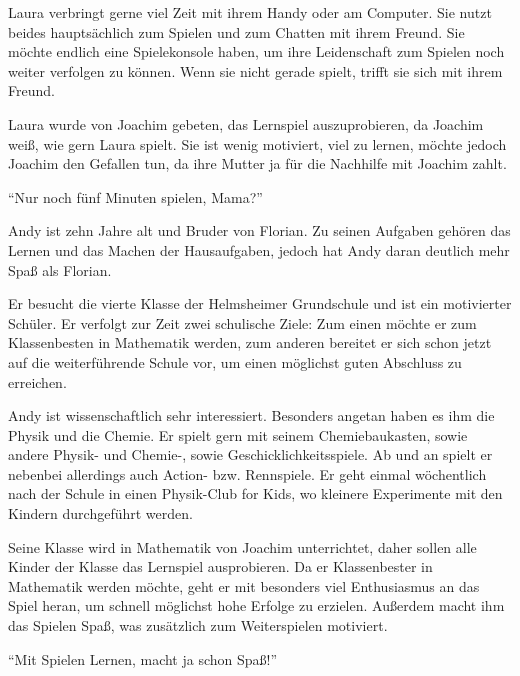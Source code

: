 \begin{description}
\begin{description}
			\item[Interessen und Hobbys]{Laura verbringt gerne viel Zeit mit ihrem Handy oder am Computer. Sie nutzt beides hauptsächlich zum Spielen und zum Chatten mit ihrem Freund. Sie möchte endlich eine Spielekonsole haben, um ihre Leidenschaft zum Spielen noch weiter verfolgen zu können. Wenn sie nicht gerade spielt, trifft sie sich mit ihrem Freund.}
			\item[Motivation]{Laura wurde von Joachim gebeten, das Lernspiel auszuprobieren, da Joachim weiß, wie gern Laura spielt. Sie ist wenig motiviert, viel zu lernen, möchte jedoch Joachim den Gefallen tun, da ihre Mutter ja für die Nachhilfe mit Joachim zahlt.}
			\item{\enquote{Nur noch fünf Minuten spielen, Mama?}}
		\end{description}
		\item[Andy Klein: Der Experte]<TODO: Bild>\hfill
		\begin{description}
			\item[Familiäres Umfeld]{Andy ist zehn Jahre alt und Bruder von Florian. Zu seinen Aufgaben gehören das Lernen und das Machen der Hausaufgaben, jedoch hat Andy daran deutlich mehr Spaß als Florian.}
			\item[Schulisches Umfeld]{Er besucht die vierte Klasse der Helmsheimer Grundschule und ist ein motivierter Schüler. Er verfolgt zur Zeit zwei schulische Ziele: Zum einen möchte er zum Klassenbesten in Mathematik werden, zum anderen bereitet er sich schon jetzt auf die weiterführende Schule vor, um einen möglichst guten Abschluss zu erreichen. }
			\item[Interessen und Hobbys]{Andy ist wissenschaftlich sehr interessiert. Besonders angetan haben es ihm die Physik und die Chemie. Er spielt gern mit seinem Chemiebaukasten, sowie andere Physik- und Chemie-, sowie Geschicklichkeitsspiele. Ab und an spielt er nebenbei allerdings auch Action- bzw. Rennspiele. Er geht einmal wöchentlich nach der Schule in einen Physik-Club for Kids, wo kleinere Experimente mit den Kindern durchgeführt werden.}
			\item[Motivation]{Seine Klasse wird in Mathematik von Joachim unterrichtet, daher sollen alle Kinder der Klasse das Lernspiel ausprobieren. Da er Klassenbester in Mathematik werden möchte, geht er mit besonders viel Enthusiasmus an das Spiel heran, um schnell möglichst hohe Erfolge zu erzielen. Außerdem macht ihm das Spielen Spaß, was zusätzlich zum Weiterspielen motiviert.}
			\item{\enquote{Mit Spielen Lernen, macht ja schon Spaß!}}
		\end{description}
	\end{description}


